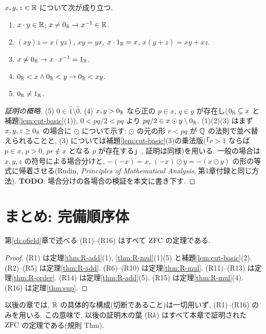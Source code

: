 \begin{thm}\label{thm:R-mul}
  $x, y, z \in \mathbb{R}$ について次が成り立つ.
  \begin{enumerate}[label=(\arabic*)]
    \item $x \cdot y \in \mathbb{R}$; $x \neq 0_{\mathbb{R}} \to x^{-1} \in \mathbb{R}$.
    \item $(xy)z = x(yz)$, $xy = yx$, $x \cdot 1_{\mathbb{R}} = x$, $x(y + z) = xy + xz$.
    \item $x \neq 0_{\mathbb{R}} \to x \cdot x^{-1} = 1_{\mathbb{R}}$.
    \item $0_{\mathbb{R}} < x \land 0_{\mathbb{R}} < y \to 0_{\mathbb{R}} < xy$.
    \item $0_{\mathbb{R}} \neq 1_{\mathbb{R}}$.
  \end{enumerate}
\end{thm}
\begin{proof}[証明の概略]
  (5) $0 \in \hat 1 \setminus \hat 0$. (4) $x, y > 0_{\mathbb{R}}$ なら正の $p \in x$, $q \in y$ が存在し($0_{\mathbb{R}} \subsetneq x$ と補題\ref{lem:cut-basic}(1)), $0 < pq/2 < pq$ より $pq/2 \in x \odot y \setminus 0_{\mathbb{R}}$.
  (1)(2)(3) はまず $x, y, z \geq 0_{\mathbb{R}}$ の場合に $\odot$ について示す: $\odot$ の元の形 $r < pq$ が $\mathbb{Q}$ の法則で並べ替えられることと, (3) については補題\ref{lem:cut-basic}(3)の乗法版(「$r > 1$ ならば $p \in x$, $p > 0$, $p r \notin x$ となる $p$ が存在する」, 証明は同様)を用いる. 一般の場合は $x, y, z$ の符号による場合分けと, $-(-x) = x$, $(-x) \odot y = -(x \odot y)$ の形の等式に帰着させる(Rudin, \emph{Principles of Mathematical Analysis}, 第1章付録と同じ方法). \textbf{TODO}: 場合分けの各場合の検証を本文に書き下す.
\end{proof}

\section{まとめ: 完備順序体}

\begin{thm}[$\R$ は完備順序体]\label{thm:complete-ordered-field}
  第\ref{ch:ofield}章で述べる (R1)--(R16) はすべて $\mathrm{ZFC}$ の定理である.
\end{thm}
\begin{proof}
  (R1) は定理\ref{thm:R-add}(1), \ref{thm:R-mul}(1)(5) と補題\ref{lem:cut-basic}(2). (R2)--(R5) は定理\ref{thm:R-add}. (R6)--(R10) は定理\ref{thm:R-mul}. (R11)--(R13) は定理\ref{thm:R-order}. (R14) は定理\ref{thm:R-add}(5). (R15) は定理\ref{thm:R-mul}(4). (R16) は定理\ref{thm:sup}.
\end{proof}

以後の章では, $\R$ の具体的な構成(切断であること)は一切用いず, (R1)--(R16) のみを用いる. この意味で, 以後の証明木の葉 (R$k$) はすべて本章で証明された $\mathrm{ZFC}$ の定理である(規則 Thm).
